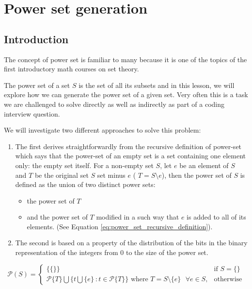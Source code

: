 %


\chapter{Power set generation}
\label{ch:power_set}
\section*{Introduction}

The concept of power set is familiar to many because it is one of the topics of the first
introductory math courses on set theory.

The power set of a set $S$ is the set of all its subsets and in this lesson, we will explore how we can generate the power set of a given set. Very often this is a task we are challenged to solve directly as well as indirectly as part of a coding interview question.

We will investigate two different approaches to solve this problem: 

\begin{enumerate}
    \item The first derives straightforwardly from the recursive definition of power-set which says that the power-set of an empty set is a set containing one element only: the empty set itself. 
    For a non-empty set $S$, let $e$ be an element of $S$ and $T$ be the original set $S$ set minus $e$ ( $T=S \setminus e$), then the power set of $S$ is defined as the union of two distinct power sets:
    \begin{itemize}
        \item   the power set of $T$
        \item   and the power set of $T$ modified in a such way that $e$ is added to all of its elements. (See Equation \ref{eq:power_set_recursive_definition}).  
    \end{itemize}
    \item The second is based on a property of the distribution of the bits in the binary representation of the integers from $0$ to the size of the
    power set. 

\end{enumerate}

\begin{equation}
    \mathcal{P}(S)=\begin{cases} 
    \{\{\}\} & \text{if } S=\{\} \\
    \mathcal{P}\{T\} \bigcup \{t \bigcup \{e\} \: : t \in \mathcal{P}\{T\}\} \text{ where }  T = S \setminus \{e\} \text{ } \forall e \in S, & \text{otherwise}
    \end{cases}
    \label{eq:power_set_recursive_definition}
\end{equation}



